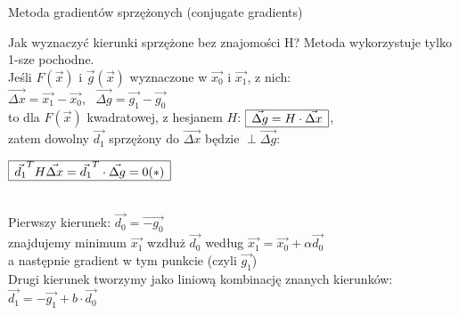   \begin{frame}{Metoda gradientów sprzężonych (conjugate gradients)}

 	\begin{block}{Jak wyznaczyć kierunki sprzężone bez znajomości H?}
 	   Metoda wykorzystuje tylko 1-sze pochodne.
 	   \medskip
 	   \\ Jeśli $F(\vec{x})$ i $\vec{g}(\vec{x})$ wyznaczone w $\vec{x_0}$ i $\vec{x_1}$, z nich:
 	   \smallskip
 	   \\ $\vec{\Delta x} = \vec{x_1} - \vec{x_0}$, \ $\vec{\Delta g} = \vec{g_1} - \vec{g_0}$
 	   \smallskip
 	   \\ to dla $F(\vec{x})$ kwadratowej, z hesjanem $H$:
 	   $\begin{array}{|c|}
 	   	  \hline
 	   	  \vec{\Delta g} = H \cdot \vec{\Delta x}
 	   	  \\ \hline
 	   \end{array}$,
 	   \\zatem dowolny $\vec{d_1}$  sprzężony do $\vec{\Delta x}$ będzie $\perp \vec{\Delta g}$:
 	   \begin{center}
 	      $\begin{array}{|c|}
 	   	    \hline
 	   	     \vec{d_1}^T H \vec{\Delta x} =\vec{d_1}^T \cdot \vec{\Delta g} = 0 (*)
 	   	    \\ \hline
 	      \end{array}$
 	   \end{center}
 	   \smallskip
 	   \\Pierwszy kierunek: $\vec{d_0} = \vec{-g_0}$
 	   \\znajdujemy minimum $\vec{x_1}$ wzdłuż $\vec{d_0}$ według $\vec{x_1}=\vec{x_0}+\alpha \vec{d_0}$
 	   \\a następnie gradient w tym punkcie  (czyli $\vec{g_1}$)
 	   \\Drugi kierunek tworzymy jako liniową kombinację znanych kierunków: $\vec{d_1} = -\vec{g_1} + b \cdot \vec{d_0}$
 	\end{block}

  \end{frame}

